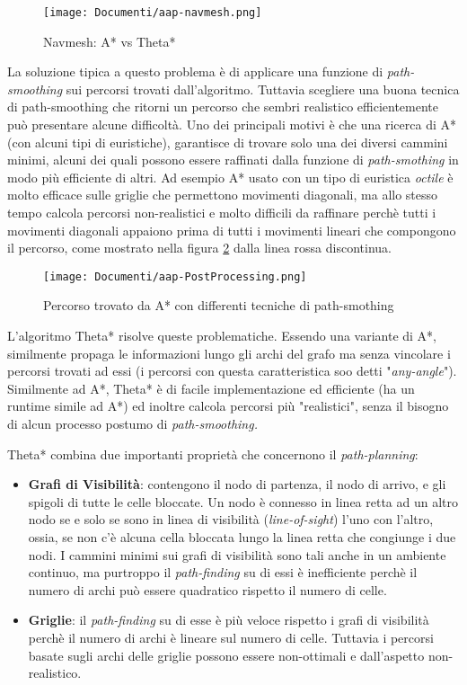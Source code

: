 \documentclass[11pt]{article}
\begin{document}
\begin{figure}[htp]
\centering
\texttt{[image: Documenti/aap-navmesh.png]}
\caption{Navmesh: A* vs Theta*}
\label{img5}
\end{figure}



\par{
La soluzione tipica a questo problema \`e di applicare una funzione di \emph{path-smoothing} sui percorsi trovati dall'algoritmo. Tuttavia scegliere una buona tecnica di path-smoothing che ritorni un percorso che sembri realistico efficientemente pu\`o presentare alcune difficolt\`a. Uno dei principali motivi \`e che una ricerca di A* (con alcuni tipi di euristiche), garantisce di trovare solo una dei diversi cammini minimi, alcuni dei quali possono essere raffinati dalla funzione di \emph{path-smothing} in modo pi\`u efficiente di altri. Ad esempio A* usato con un tipo di euristica \emph{octile} \`e molto efficace sulle griglie che permettono movimenti diagonali, ma allo stesso tempo calcola percorsi non-realistici e molto difficili da raffinare perch\`e tutti i movimenti diagonali appaiono prima di tutti i movimenti lineari che compongono il percorso, come mostrato nella figura \ref{img6} dalla linea rossa discontinua.
\begin{figure}[htp]
\centering
\texttt{[image: Documenti/aap-PostProcessing.png]}
\caption{Percorso trovato da A* con differenti tecniche di path-smothing}
\label{img6}
\end{figure}
}


\par{
L'algoritmo Theta* risolve queste problematiche. Essendo una variante di A*, similmente propaga le informazioni lungo gli archi del grafo ma senza vincolare i percorsi trovati ad essi (i percorsi con questa caratteristica soo detti "\emph{any-angle}"). 
Similmente ad A*, Theta* \`e di facile implementazione ed efficiente (ha un runtime simile ad A*) ed inoltre calcola percorsi pi\`u "realistici", senza il bisogno di alcun processo postumo di \emph{path-smoothing.} 
}
\par{
Theta* combina due importanti propriet\`a che concernono il \emph{path-planning}: 


\begin{itemize}
\item \textbf{Grafi di Visibilit\`a}: contengono il nodo di partenza, il nodo di arrivo, e gli spigoli di tutte le celle bloccate. Un nodo \`e connesso in linea retta ad un altro nodo se e solo se sono in linea di visibilit\`a (\emph{line-of-sight}) l'uno con l'altro, ossia, se non c'\`e alcuna cella bloccata lungo la linea retta che congiunge i due nodi. I cammini minimi sui grafi di visibilit\`a sono tali anche in un ambiente continuo, ma purtroppo il \emph{path-finding} su di essi \`e inefficiente perch\`e il numero di archi pu\`o essere quadratico rispetto il numero di celle.
\item \textbf{Griglie}: il \emph{path-finding} su di esse \`e pi\`u veloce rispetto i grafi di visibilit\`a perch\`e il numero di archi \`e lineare sul numero di celle. Tuttavia i percorsi basate sugli archi delle griglie possono essere non-ottimali e dall'aspetto non-realistico.
\end{itemize}}
\end{document}
